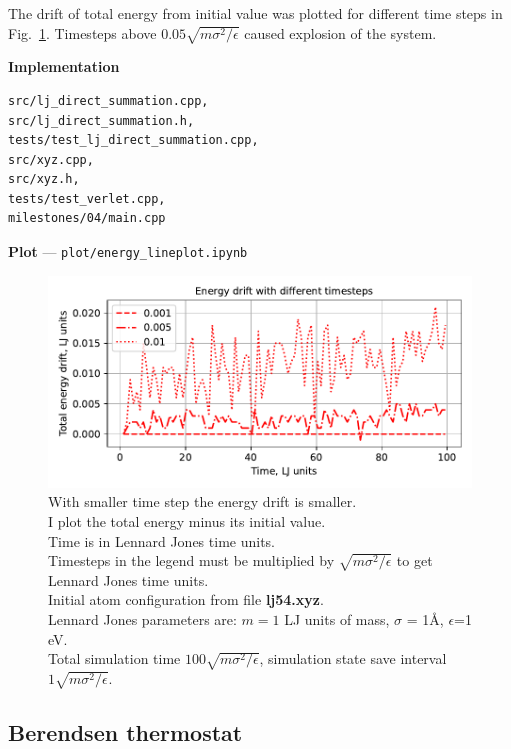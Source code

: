 \documentclass[12pt,a4paper]{article}
\begin{document}
The drift of total energy from initial value was plotted for different time steps in Fig.~\ref{fig:first_simulation}. Timesteps above $0.05 \sqrt{m\sigma^2 / \epsilon}$ caused explosion of the system.

{\bf Implementation}
\begin{lstlisting}[breaklines]
src/lj_direct_summation.cpp, 
src/lj_direct_summation.h,
tests/test_lj_direct_summation.cpp,
src/xyz.cpp,
src/xyz.h,
tests/test_verlet.cpp,
milestones/04/main.cpp
\end{lstlisting}


{\bf Plot} --- \verb|plot/energy_lineplot.ipynb|

\begin{figure}[htb]
	\centering
	\includegraphics[width=.7\linewidth]{img/milestone04-total.pdf}
	\caption{With smaller time step the energy drift is smaller.\\
		I plot the total energy minus its initial value.\\
		Time is in Lennard Jones time units.\\
		Timesteps in the legend must be multiplied by $\sqrt{m\sigma^2 / \epsilon}$ to get Lennard Jones time units.\\
		Initial atom configuration from file {\bf lj54.xyz}.\\
		Lennard Jones parameters are: $m=1$ LJ units of mass, $\sigma$ = 1Å, $\epsilon$=1 eV.\\
		Total simulation time \( 100 \sqrt{m\sigma^2 / \epsilon} \), simulation state save interval \( 1 \sqrt{m\sigma^2 / \epsilon} \).}
	\label{fig:first_simulation}
\end{figure}

\clearpage


\subsection*{Berendsen thermostat}
\end{document}
